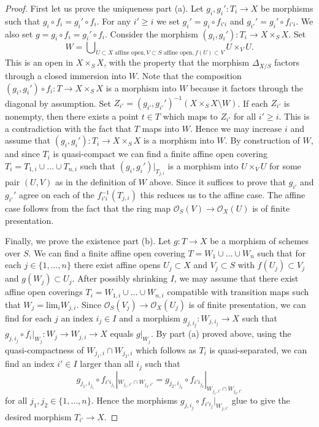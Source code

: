 \documentclass{article}
\begin{document}
\begin{proof}
    First let us prove the uniqueness part (a). Let $g_i,g_i':T_i \to X$ be morphisms such that $g_i \circ f_i=g_i' \circ f_i$. For any $i' \ge i$ we set $g_i' = g_i \circ f_{i' i}$ and $g_{i'}'=g_i' \circ f_{i'i}$. We also set $g=g_i \circ f_i=g_i' \circ f_i$. Consider the morphism $(g_i,g_i'):T_i \to X \times_S X$. Set
    \[
        W = \bigcup \nolimits _{U \subset X \text{ affine open}, V \subset S \text{ affine open}, f(U) \subset V} U \times_V U.
    \]
    This is an open in $X \times_S X$, with the property that the morphism $\Delta_{X/S}$ factors through a closed immersion into $W$. Note that the composition $(g_i,g_i') \circ f_i:T \to X \times_S X$ is a morphism into $W$ because it factors through the diagonal by assumption. Set $Z_{i'}=(g_{i'},g_{i'}')^{-1}(X \times_S X \setminus W)$. If each $Z_{i'}$ is nonempty, then there exists a point $t \in T$ which maps to $Z_{i'}$ for all $i' \ge i$. This is a contradiction with the fact that $T$ maps into $W$. Hence we may increase $i$ and assume that $(g_i,g_i'):T_i \to X \times_S X$ is a morphism into $W$. By construction of $W$, and since $T_i$ is quasi-compact we can find a finite affine open covering $T_i=T_{1,i} \cup \dots \cup T_{n,i}$ such that $(g_i,g_i')|_{T_{j,i}}$ is a morphism into $U \times_V U$ for some pair $(U,V)$ as in the definition of $W$ above. Since it suffices to prove that $g_{i'}$ and $g_{i'}'$ agree on each of the $f_{i'i}^{-1}(T_{j,i})$ this reduces us to the affine case. The affine case follows from the fact that the ring map $\mathcal{O}_S(V) \to \mathcal{O}_X(U)$ is of finite presentation.

    Finally, we prove the existence part (b). Let $g:T \to X$ be a morphism of schemes over $S$. We can find a finite affine open covering $T=W_1 \cup \dots \cup W_n$ such that for each $j \in \{1,\dots,n\}$ there exist affine opens $U_j \subset X$ and $V_j \subset S$ with $f(U_j) \subset V_j$ and $g(W_j) \subset U_j$. After possibly shrinking $I$, we may assume that there exist affine open coverings $T_i=W_{1,i} \cup \dots \cup W_{n,i}$ compatible with transition maps such that $W_j=\mathrm{lim}_i W_{j,i}$. Since $\mathcal{O}_S(V_j) \to \mathcal{O}_X(U_j)$ is of finite presentation, we can find for each $j$ an index $i_j \in I$ and a morphism $g_{j,i_j}:W_{j,i_j} \to X$ such that $g_{j,i_j}\circ f_i|_{W_j}:W_j \to W_{j,i} \to X$ equals $g|_{W_j}$. By part (a) proved above, using the quasi-compactness of $W_{j_1,i} \cap W_{j_2,i}$ which follows as $T_i$ is quasi-separated, we can find an index $i' \in I$ larger than all $i_j$ such that
    \[
        g_{j_1,i_{j_1}} \circ f_{i' i_{j_1}} |_{W_{j_1,i'} \cap W_{j_2,i'}} = g_{j_2,i_{j_2}} \circ f_{i' i_{j_2}} |_{W_{j_1,i'} \cap W_{j_2,i'}}
    \]
    for all $j_1,j_2 \in \{1,\dots,n\}$. Hence the morphisms $g_{j,i_j} \circ f_{i' i_j}|_{W_{j,i'}}$ glue to give the desired morphism $T_{i'} \to X$.
\end{proof}
\end{document}
